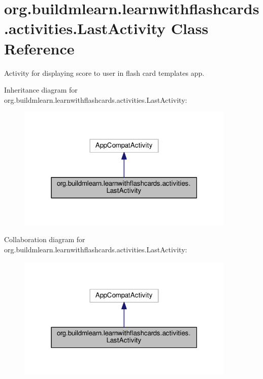\hypertarget{classorg_1_1buildmlearn_1_1learnwithflashcards_1_1activities_1_1LastActivity}{}\section{org.\+buildmlearn.\+learnwithflashcards.\+activities.\+Last\+Activity Class Reference}
\label{classorg_1_1buildmlearn_1_1learnwithflashcards_1_1activities_1_1LastActivity}


Activity for displaying score to user in flash card template\textquotesingle{}s app.  




Inheritance diagram for org.\+buildmlearn.\+learnwithflashcards.\+activities.\+Last\+Activity\+:
\nopagebreak
\begin{figure}[H]
\begin{center}
\leavevmode
\includegraphics[width=295pt]{classorg_1_1buildmlearn_1_1learnwithflashcards_1_1activities_1_1LastActivity__inherit__graph}
\end{center}
\end{figure}


Collaboration diagram for org.\+buildmlearn.\+learnwithflashcards.\+activities.\+Last\+Activity\+:
\nopagebreak
\begin{figure}[H]
\begin{center}
\leavevmode
\includegraphics[width=295pt]{classorg_1_1buildmlearn_1_1learnwithflashcards_1_1activities_1_1LastActivity__coll__graph}
\end{center}
\end{figure}
